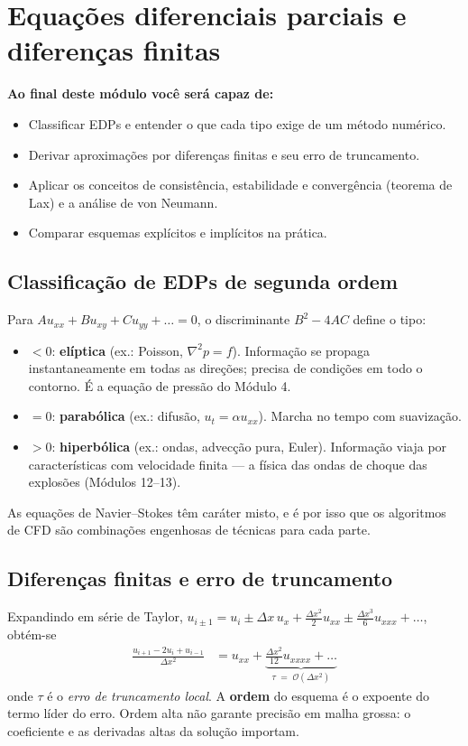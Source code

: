 \documentclass[10pt,a4paper,twocolumn,openany]{report}
\newenvironment{conceito}[1]{\section{#1}}{\par}
\newcommand{\objetivos}{\noindent\textbf{Ao final deste módulo você será capaz de:}}
\begin{document}
\renewcommand{\thechapter}{\arabic{chapter}}
\renewcommand{\theHchapter}{\arabic{chapter}}
\setcounter{chapter}{0}

\chapter{Equações diferenciais parciais e diferenças finitas}

\objetivos
\begin{itemize}
  \item Classificar EDPs e entender o que cada tipo exige de um método numérico.
  \item Derivar aproximações por diferenças finitas e seu erro de truncamento.
  \item Aplicar os conceitos de consistência, estabilidade e convergência
        (teorema de Lax) e a análise de von Neumann.
  \item Comparar esquemas explícitos e implícitos na prática.
\end{itemize}

\begin{conceito}{Classificação de EDPs de segunda ordem}
Para $A u_{xx} + B u_{xy} + C u_{yy} + \ldots = 0$, o discriminante
$B^2-4AC$ define o tipo:
\begin{itemize}
  \item $<0$: \textbf{elíptica} (ex.: Poisson, $\nabla^2 p = f$). Informação
        se propaga instantaneamente em todas as direções; precisa de
        condições em todo o contorno. É a equação de pressão do Módulo 4.
  \item $=0$: \textbf{parabólica} (ex.: difusão, $u_t = \alpha u_{xx}$).
        Marcha no tempo com suavização.
  \item $>0$: \textbf{hiperbólica} (ex.: ondas, advecção pura, Euler).
        Informação viaja por características com velocidade finita ---
        a física das ondas de choque das explosões (Módulos 12--13).
\end{itemize}
As equações de Navier--Stokes têm caráter misto, e é por isso que os
algoritmos de CFD são combinações engenhosas de técnicas para cada parte.
\end{conceito}

\begin{conceito}{Diferenças finitas e erro de truncamento}
Expandindo em série de Taylor, $u_{i\pm1} = u_i \pm \Delta x\, u_x +
\tfrac{\Delta x^2}{2} u_{xx} \pm \tfrac{\Delta x^3}{6}u_{xxx} + \ldots$, obtém-se
\begin{align*}
  \frac{u_{i+1}-2u_i+u_{i-1}}{\Delta x^2}
  &= u_{xx} + \underbrace{\frac{\Delta x^2}{12}u_{xxxx} + \ldots}_{\tau\;=\;\mathcal{O}(\Delta x^2)}
\end{align*}
onde $\tau$ é o \emph{erro de truncamento local}.
A \textbf{ordem} do esquema é o expoente do termo líder do erro. Ordem alta
não garante precisão em malha grossa: o coeficiente e as derivadas altas
da solução importam.
\end{conceito}
\end{document}
